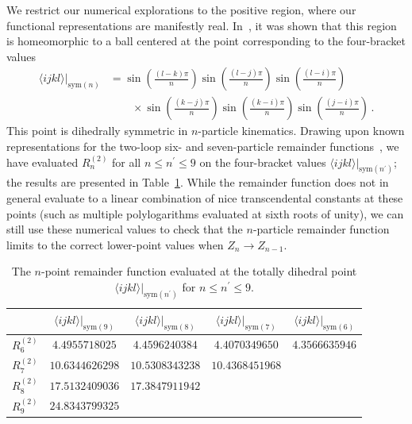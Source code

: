 \documentclass[11pt]{article}
\begin{document}
We restrict our numerical explorations to the positive region, where our functional representations are manifestly real. In~\cite{Galashin:2017onl}, it was shown that this region is homeomorphic to a ball centered at the point corresponding to the four-bracket values
\begin{align}
\langle i j k l \rangle \big|_{\text{sym}(n)} &= \sin\left(\frac{(l - k) \pi}{n} \right) \sin\left(\frac{(l - j) \pi}{n} \right) \sin\left(\frac{(l - i) \pi}{n}\right) \nonumber \\
&\qquad \times \sin\left(\frac{(k - j) \pi}{n}\right) \sin\left(\frac{(k - i) \pi}{n}\right) \sin\left(\frac{(j - i) \pi}{n}\right) \, . \label{eq:symmetric_point}
\end{align}
This point is dihedrally symmetric in $n$-particle kinematics. Drawing upon known representations for the two-loop six- and seven-particle remainder functions~\cite{DelDuca:2009au,DelDuca:2010zg,Goncharov:2010jf,Golden:2014xqf}, we have evaluated $R_n^{(2)}$ for all $n \leq n^\prime \leq 9$ on the four-bracket values $\langle i j k l \rangle \big|_{\text{sym}(n^\prime)}$; the results are presented in Table~\ref{table:symmetric_point_numerics}. While the  remainder function does not in general evaluate to a linear combination of nice transcendental constants at these points (such as multiple polylogarithms evaluated at sixth roots of unity), we can still use these numerical values to check that the $n$-particle remainder function limits to the correct lower-point values when $Z_n \to Z_{n-1}$. 

\begin{table}[!t]
\begin{center}
\renewcommand{\arraystretch}{1.2}
\begin{tabular}{| l || c | c | c | c |}
\hline
\ & $\langle i j k l \rangle \big|_{\text{sym}(9)}$ & $\langle i j k l \rangle \big|_{\text{sym}(8)}$ & $\langle i j k l \rangle \big|_{\text{sym}(7)}$ & $\langle i j k l \rangle \big|_{\text{sym}(6)}$ \\[.12cm]
\hline\hline
$R^{(2)}_6$  & $4.4955718025$ & $4.4596240384$ & $4.4070349650$ & $4.3566635946$  \\
$R^{(2)}_7$  & $10.6344626298$ & $10.5308343238$  & $10.4368451968$ & \ \\
$R^{(2)}_8$  & $17.5132409036$ & $17.3847911942$  & \  & \ \\
$R^{(2)}_9$  & $24.8343799325$ & \  & \  & \ \\
\hline
\end{tabular}
\caption{The $n$-point remainder function evaluated at the totally dihedral point $\langle i j k l \rangle \big|_{\text{sym}(n^\prime)}$ for $n \leq n^\prime \leq 9$.}
\label{table:symmetric_point_numerics}
\end{center}
\end{table}
\end{document}

